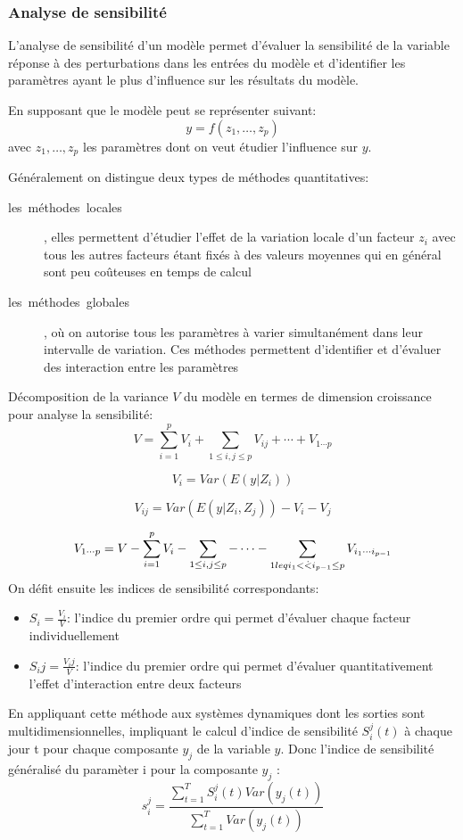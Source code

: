 \subsubsection{Analyse de sensibilité}
L'analyse de sensibilité d'un modèle permet d'évaluer la sensibilité de la
variable réponse à des perturbations dans les entrées du modèle et
d'identifier les paramètres ayant le plus d'influence
sur les résultats du modèle.

En supposant que le modèle peut se représenter suivant:
\[
  y = f(z_1,\dots,z_p)
\]
avec $z_1,\dots ,z_p$ les paramètres dont on veut étudier l'influence sur $y$.

Généralement on distingue deux types de méthodes quantitatives:
\begin{description}
  \item[les\ méthodes\ locales], elles permettent d'étudier l'effet de la
variation locale d'un facteur $z_i$ avec tous les autres facteurs étant fixés à des valeurs moyennes qui en général sont peu coûteuses en temps de calcul
\item[les\ méthodes\ globales], où on autorise tous les paramètres à varier simultanément dans leur intervalle de variation. Ces méthodes permettent d'identifier et d'évaluer des interaction entre les paramètres
\end{description}
Décomposition de la variance $V$ du modèle en termes de dimension croissance pour analyse la sensibilité:
\[ {V}=\sum_{i=1}^pV_i+\sum_{1\leq i,j \leq p} V_{ij}+\cdots +V_{1\cdots p}\]

\[ {V_i}=Var(E(y|Z_i))\]

\[ {V_{ij}}=Var(E(y|Z_i,Z_j))-V_i-V_j \]

\[ {V_{1\cdots p}}=V-\sum_{i=1}^p V_i-\sum_{1\leq i,j \leq p}-\cdots -\sum_{1\\leq i_1<\dot <i_{p-1}\leq p} V_{i_1 \cdots i_{p-1}} \]
On défit ensuite les indices de sensibilité correspondants:
\begin{itemize}
\item $S_i=\frac{V_i}{V}$: l'indice du premier ordre qui permet d'évaluer chaque facteur individuellement
\item $S_ij=\frac{V_ij}{V}$: l'indice du premier ordre qui permet d'évaluer quantitativement l'effet d'interaction entre deux facteurs
\end{itemize}
En appliquant cette méthode aux systèmes dynamiques dont les sorties sont multidimensionnelles, impliquant le calcul d'indice de sensibilité $S_i^j(t)$ à chaque jour t pour chaque composante $y_j$ de la variable $y$.
Donc l'indice de sensibilité généralisé du paramèter i  pour la composante $y_j$ :
\[ {s_i^j}=\frac{\sum_{t=1}^TS_i^j(t)Var(y_j(t))}{\sum_{t=1}^T Var(y_j(t))} \]